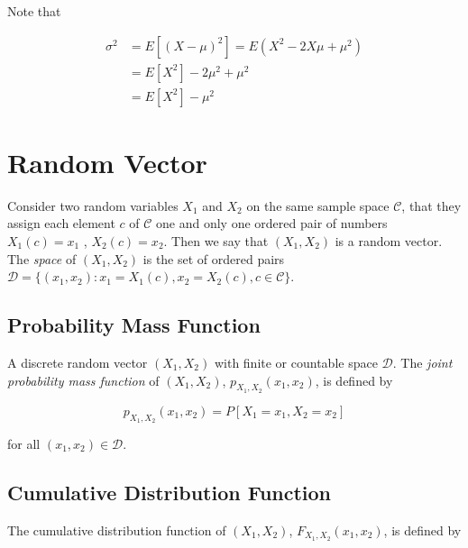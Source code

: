 \documentclass{article}
\begin{document}
            Note that

            \begin{align*}
                \sigma^2 &= E [ ( X - \mu )^{2} ] = E ( X^2 - 2 X \mu + \mu^{2} ) \\
                         &= E [ X^{2} ] - 2 \mu^{2} + \mu^{2} \\
                         &= E [ X^{2} ] - \mu^{2}
            \end{align*}

    \section{Random Vector}

        Consider two random variables $ X_{1} $ and $ X_{2} $ on the same
        sample space $ \mathcal{C} $, that they assign each element $ c $ of $
        \mathcal{C} $ one and only one ordered pair of numbers $ X_{1}(c) =
        x_{1} $ , $ X_{2}(c) = x_{2} $. Then we say that $ (X_{1}, X_{2}) $ is
        a random vector. The \textit{space} of $ (X_{1}, X_{2}) $ is the set
        of ordered pairs $ \mathcal{D} =  \{ (x_{1}, x_{2}) : x_{1} = X_{1}(c),
        x_{2} = X_{2}(c), c \in \mathcal{C} \} $.

        \subsection{Probability Mass Function}

            A discrete random vector $ (X_{1}, X_{2}) $ with finite or
            countable space $ \mathcal{D} $. The \textit{joint probability mass
            function} of $ (X_{1}, X_{2})$, $ p_{X_{1}, X_{2}}(x_{1}, x_{2}) $,
            is defined by

            \begin{equation*}
                p_{ X_{1}, X_{2}} (x_{1}, x_{2}) = P [ X_{1} = x_{1}, X_{2} = x_{2} ]
            \end{equation*}

            for all $ (x_{1}, x_{2}) \in \mathcal{D} $.

        \subsection{Cumulative Distribution Function}

            The cumulative distribution function of $ (X_{1}, X_{2}) $, $
            F_{X_{1}, X_{2}} (x_{1}, x_{2}) $, is defined by
\end{document}
